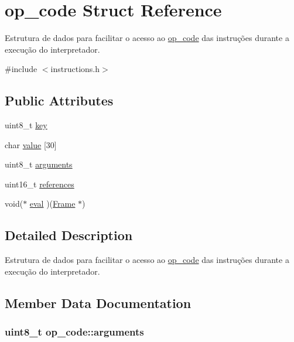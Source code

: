 \hypertarget{structop__code}{}\section{op\+\_\+code Struct Reference}
\label{structop__code}


Estrutura de dados para facilitar o acesso ao \hyperlink{structop__code}{op\+\_\+code} das instruções durante a execução do interpretador.  




{\ttfamily \#include $<$instructions.\+h$>$}

\subsection*{Public Attributes}
\begin{DoxyCompactItemize}
\item 
uint8\+\_\+t \hyperlink{structop__code_adfbb2fc6e07e6fda7e392c0b6f6f64b6}{key}
\item 
char \hyperlink{structop__code_a0b74d91235a8b9f0a36710d68c2746d1}{value} \mbox{[}30\mbox{]}
\item 
uint8\+\_\+t \hyperlink{structop__code_ac059fd01f71776bebdc8fcccd44f7476}{arguments}
\item 
uint16\+\_\+t \hyperlink{structop__code_a8d28fff7d91873f58a4a12205dd0f8e0}{references}
\item 
void($\ast$ \hyperlink{structop__code_acd2c8c9ef3e72b9f110127c854620472}{eval} )(\hyperlink{structFrame}{Frame} $\ast$)
\end{DoxyCompactItemize}


\subsection{Detailed Description}
Estrutura de dados para facilitar o acesso ao \hyperlink{structop__code}{op\+\_\+code} das instruções durante a execução do interpretador. 

\subsection{Member Data Documentation}
\subsubsection[{\texorpdfstring{arguments}{arguments}}]{\setlength{\rightskip}{0pt plus 5cm}uint8\+\_\+t op\+\_\+code\+::arguments}\hypertarget{structop__code_ac059fd01f71776bebdc8fcccd44f7476}{}\label{structop__code_ac059fd01f71776bebdc8fcccd44f7476}
